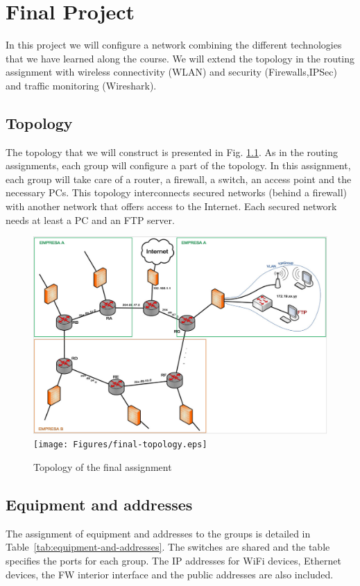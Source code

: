 \chapter{Final Project}

In this project we will configure a network combining the different technologies that we have learned along the course.
We will extend the topology in the routing assignment with wireless connectivity (WLAN) and security (Firewalls,IPSec) and traffic monitoring (Wireshark).

\section{Topology}

The topology that we will construct is presented in Fig. \ref{fig:final-topology}.
As in the routing assignments, each group will configure a part of the topology.
In this assignment, each group will take care of a router, a firewall, a switch, an access point and the necessary PCs.
This topology interconnects secured networks (behind a firewall) with another network that offers access to the Internet.
Each secured network needs at least a PC and an FTP server.

\begin{figure}
\centering
\ifpdf
\includegraphics[width=0.9\linewidth]{Figures/final-topology.pdf}
\else
\texttt{[image: Figures/final-topology.eps]}
\fi
\caption{Topology of the final assignment}
\label{fig:final-topology}
\end{figure}

\section{Equipment and addresses}
The assignment of equipment and addresses to the groups is detailed in Table~\ref{tab:equipment-and-addresses}.
The switches are shared and the table specifies the ports for each group.
The IP addresses for WiFi devices, Ethernet devices, the FW interior interface and the public addresses are also included.

